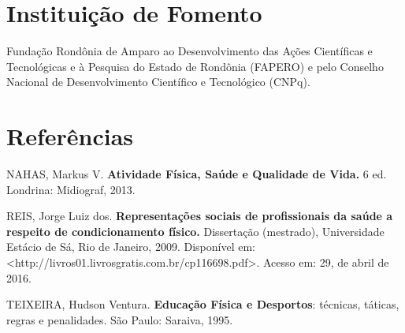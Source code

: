 \documentclass[article,12pt,onesidea,4paper,english,brazil]{abntex2}
\begin{document}
	\section*{Instituição de Fomento}
	
	Fundação Rondônia de Amparo ao Desenvolvimento das Ações Científicas e Tecnológicas e à Pesquisa do Estado de Rondônia (FAPERO) e pelo Conselho Nacional de Desenvolvimento Científico e Tecnológico (CNPq).
	
	\section*{Referências}
	
\noindent NAHAS, Markus V. \textbf{Atividade Física, Saúde e Qualidade de Vida.} 6 ed. Londrina: Midiograf, 2013.

\noindent REIS, Jorge Luiz dos. \textbf{Representações sociais de profissionais da saúde a respeito de condicionamento físico.} Dissertação (mestrado), Universidade Estácio de Sá, Rio de Janeiro, 2009. Disponível em:<http://livros01.livrosgratis.com.br/cp116698.pdf>. Acesso em: 29, de abril de 2016.

\noindent TEIXEIRA, Hudson Ventura. \textbf{Educação Física e Desportos}: técnicas, táticas, regras e penalidades. São Paulo: Saraiva, 1995.
	
\end{document}
